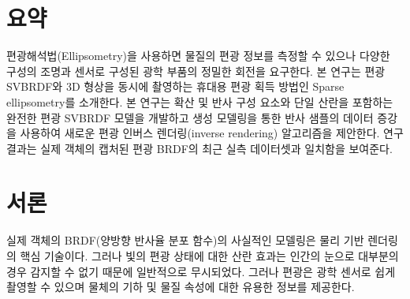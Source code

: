 \documentclass[a4paper,twocolumn]{article}
\begin{document}
\let\thefootnote\relax{}
\let\thefootnote\relax{}

\section*{요약}
\label{sec:abstrct}
	편광해석법(Ellipsometry)을 사용하면 물질의 편광 정보를 측정할 수 있으나 다양한 구성의 조명과 센서로 구성된 광학 부품의 정밀한 회전을 요구한다. 
	본 연구는 편광 SVBRDF와 3D 형상을 동시에 촬영하는 휴대용 편광 획득 방법인 Sparse ellipsometry를 소개한다. 
	본 연구는 확산 및 반사 구성 요소와 단일 산란을 포함하는 완전한 편광 SVBRDF 모델을 개발하고 생성 모델링을 통한 반사 샘플의 데이터 증강을 사용하여 새로운 편광 인버스 렌더링(inverse rendering) 알고리즘을 제안한다. 연구 결과는 실제 객체의 캡처된 편광 BRDF의 최근 실측 데이터셋과 일치함을 보여준다.
	

\section{서론}
\label{sec:introduction}
실제 객체의 BRDF(양방향 반사율 분포 함수)의 사실적인 모델링은 물리 기반 렌더링의 핵심 기술이다.
그러나 빛의 편광 상태에 대한 산란 효과는 인간의 눈으로 대부분의 경우 감지할 수 없기 때문에 일반적으로 무시되었다.
그러나 편광은 광학 센서로 쉽게 촬영할 수 있으며 물체의 기하 및 물질 속성에 대한 유용한 정보를 제공한다.
\end{document}
